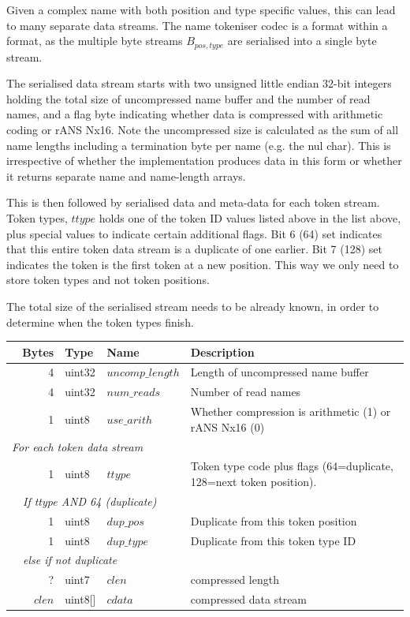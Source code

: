 \documentclass[a4paper]{article}
\begin{document}
Given a complex name with both position and type specific values, this
can lead to many separate data streams.  The name tokeniser codec is
a format within a format, as the multiple byte streams $B_{pos,type}$
are serialised into a single byte stream.

The serialised data stream starts with two unsigned little endian
32-bit integers holding the total size of uncompressed name buffer and
the number of read names, and a flag byte indicating whether data is
compressed with arithmetic coding or rANS Nx16.
Note the uncompressed size is calculated as the sum of
all name lengths including a termination byte per name (e.g. the nul
char).  This is irrespective of whether the implementation produces
data in this form or whether it returns separate name and name-length
arrays.

This is then followed by serialised data and meta-data for each token
stream.
Token types, $ttype$ holds one of the token ID values listed above
in the list above, plus special values to indicate certain additional
flags.  Bit 6 (64) set indicates that this entire token data stream is a
duplicate of one earlier.  Bit 7 (128) set indicates the token
is the first token at a new position.  This way we only need to store
token types and not token positions.

The total size of the serialised stream needs to be already known, in
order to determine when the token types finish.

\begin{tabular}{|r|r|r|l|l|p{10cm}|}
\hline
\multicolumn{3}{|r|}{\textbf{Bytes}} & \textbf{Type} & \textbf{Name} & \textbf{Description}\\
\hline
\multicolumn{3}{|r|}{4} & uint32 & $uncomp\_length$ & Length of uncompressed name buffer\\
\multicolumn{3}{|r|}{4} & uint32 & $num\_reads$ & Number of read names\\
\multicolumn{3}{|r|}{1} & uint8  & $use\_arith$ & Whether compression is arithmetic (1) or rANS Nx16 (0)\\
\hline
\multicolumn{6}{|l|}{\quad\textit{For each token data stream}}\\
\cline{2-6}
& \multicolumn{2}{r|}{1} & uint8 & $ttype$ & Token type code plus flags (64=duplicate, 128=next token position).\\
\cline{2-6}
& \multicolumn{5}{l|}{\textit{If ttype AND 64 (duplicate)}}\\
\cline{3-6}
& & 1 & uint8 & $dup\_pos$  & Duplicate from this token position\\
& & 1 & uint8 & $dup\_type$ & Duplicate from this token type ID\\
\cline{3-6}
& \multicolumn{5}{l|}{\textit{else if not duplicate}}\\
\cline{3-6}
& & ? & uint7 & $clen$ & compressed length\\
& & $clen$ & uint8[] & $cdata$ & compressed data stream\\
\hline
\end{tabular}
\end{document}
